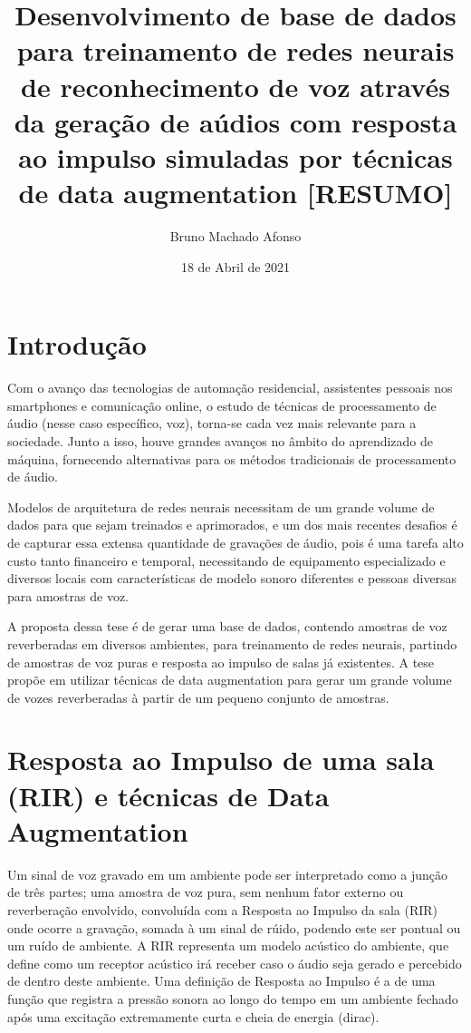 \documentclass{article}
\title{Desenvolvimento de base de dados para treinamento de redes neurais de reconhecimento de voz
através da geração de aúdios com resposta ao impulso simuladas por técnicas de data augmentation [RESUMO]}
\author{Bruno Machado Afonso}
\date{18 de Abril de 2021}
\begin{document}
\maketitle

\section{Introdução}

Com o avanço das tecnologias de automação residencial, assistentes pessoais nos
smartphones e comunicação online, o estudo de técnicas de processamento de áudio (nesse 
caso específico, voz), torna-se cada vez mais relevante para a sociedade.
Junto a isso, houve grandes avanços no âmbito do aprendizado de máquina, fornecendo
alternativas para os métodos tradicionais de processamento de áudio.

Modelos de arquitetura de redes neurais necessitam de um grande volume de dados para que sejam 
treinados e aprimorados, e um dos mais recentes desafios é de capturar essa extensa 
quantidade de gravações de áudio, pois é uma tarefa alto custo tanto financeiro e 
temporal, necessitando de equipamento especializado e diversos locais com características de modelo sonoro diferentes
e pessoas diversas para amostras de voz.

A proposta dessa tese é de gerar uma base de dados, contendo amostras de voz reverberadas
em diversos ambientes, para treinamento de redes neurais, 
partindo de amostras de voz puras e resposta ao impulso de salas já existentes.
A tese propõe em utilizar técnicas de data augmentation para gerar um grande volume
de vozes reverberadas à partir de um pequeno conjunto de amostras.

\hfill

\section{Resposta ao Impulso de uma sala (RIR) e técnicas de Data Augmentation}

Um sinal de voz gravado em um ambiente pode ser interpretado como a junção de três
partes; uma amostra de voz pura, sem nenhum fator externo ou reverberação envolvido,
convoluída com a Resposta ao Impulso da sala (RIR) onde ocorre a gravação, somada à
um sinal de rúido, podendo este ser pontual ou um ruído de ambiente.
A RIR representa um modelo acústico do ambiente, que define como um receptor acústico
irá receber caso o áudio seja gerado e percebido de dentro deste ambiente.
Uma definição de Resposta ao Impulso é a de uma função que registra a pressão sonora 
ao longo do tempo em um ambiente fechado após uma excitação extremamente curta e 
cheia de energia (dirac).
\end{document}
